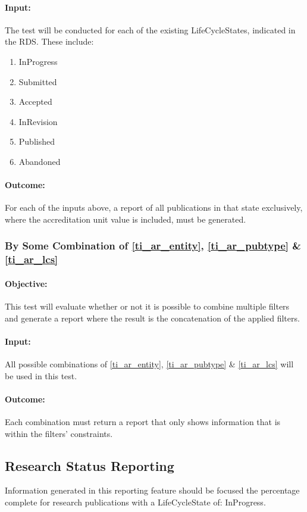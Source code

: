 \paragraph{Input:}
The test will be conducted for each of the existing LifeCycleStates, indicated in the RDS. These include:
\begin{enumerate}
	\item InProgress
	\item Submitted
	\item Accepted
	\item InRevision
	\item Published
	\item Abandoned
\end{enumerate}

\paragraph{Outcome:}
For each of the inputs above, a report of all publications in that state exclusively, where the accreditation unit value is included, must be generated.

\subsubsection{By Some Combination of \ref{ti_ar_entity}, \ref{ti_ar_pubtype} \& \ref{ti_ar_lcs}}
\paragraph{Objective:}
This test will evaluate whether or not it is possible to combine multiple filters and generate a report where the result is the concatenation of the applied filters.
\paragraph{Input:}
All possible combinations of \ref{ti_ar_entity}, \ref{ti_ar_pubtype} \& \ref{ti_ar_lcs} will be used in this test.
\paragraph{Outcome:}
Each combination must return a report that only shows information that is within the filters' constraints.

\subsection{Research Status Reporting}
Information generated in this reporting feature should be focused the percentage complete for research publications with a LifeCycleState of: InProgress.

